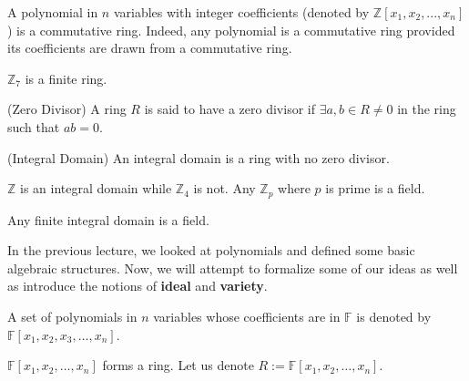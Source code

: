 \begin{example}
A polynomial in $n$ variables with integer coefficients (denoted by $\mathbb{Z}[x_1,x_2,...,x_n]$) is a commutative ring. Indeed, any polynomial is a commutative ring provided its coefficients are drawn from a commutative ring.
\end{example}
\begin{example}
$\mathbb{Z}_7$ is a finite ring.\\
\end{example}
\begin{definition} (Zero Divisor)
A ring $R$ is said to have a zero divisor if $\exists a,b\in R \neq 0$ in the ring such that $ab = 0$.
\end{definition}
\begin{definition} (Integral Domain)
An integral domain is a ring with no zero divisor.
\end{definition}
\begin{example}
$\mathbb{Z}$ is an integral domain while $\mathbb{Z}_4$ is not. Any $\mathbb{Z}_p$ where $p$ is prime is a field.
\end{example}
\begin{theorem} \label{thm:finite-id-is-field}
Any finite integral domain is a field.
\end{theorem}


In the previous lecture, we looked at polynomials and defined some basic algebraic structures. Now, we will attempt to formalize some of our ideas as well as introduce the notions of \textbf{ideal} and \textbf{variety}.\\

\begin{notation}
A set of polynomials in $n$ variables whose coefficients are in $\mathbb{F}$ is denoted by $\mathbb{F}[x_1,x_2,x_3,\dots,x_n]$.
\end{notation}


\begin{observation}
$\mathbb{F}[x_1,x_2,\ldots,x_n]$ forms a ring. Let us denote $R:=\mathbb{F}[x_1,x_2,\ldots,x_n]$.
\end{observation}

